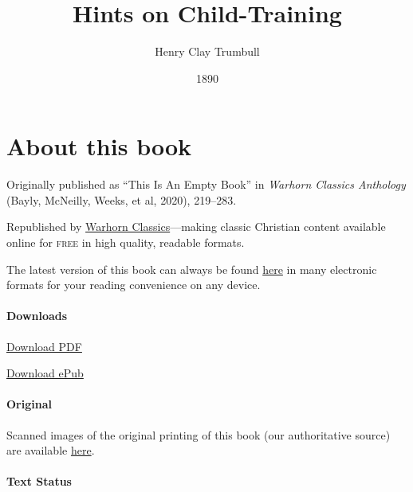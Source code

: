\documentclass[
]{book}
\title{Hints on Child-Training}
\author{Henry Clay Trumbull}
\date{1890}
\begin{document}
\maketitle

\mainmatter
{}

{
\setcounter{tocdepth}{1}
\tableofcontents
}
\hypertarget{about-this-book}{%
\chapter*{About this book}\label{about-this-book}}

Originally published as ``This Is An Empty Book'' in \emph{Warhorn Classics Anthology} (Bayly, McNeilly, Weeks, et al, 2020), 219--283.

Republished by \href{https://classics.warhornmedia.com/}{Warhorn Classics}---making classic Christian content available online for \textsc{free} in high quality, readable formats.

The latest version of this book can always be found \href{https://warhornmedia.github.io/child-training-trumbull/}{here} in many electronic formats for your reading convenience on any device.

\hypertarget{downloads}{%
\subsubsection*{Downloads}\label{downloads}}

\href{https://warhornmedia.github.io/child-training-trumbull//Trumbull-Hints_on_Child_Training.pdf}{Download PDF}

\href{https://warhornmedia.github.io/child-training-trumbull//Trumbull-Hints_on_Child_Training.epub}{Download ePub}

\hypertarget{original}{%
\subsubsection*{Original}\label{original}}

Scanned images of the original printing of this book (our authoritative source) are available \href{https://archive.org/details/hintsonchildtrai00trum}{here}.

\hypertarget{text-status}{%
\subsubsection*{Text Status}\label{text-status}}
\end{document}
